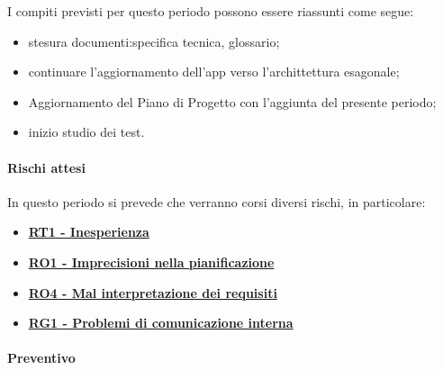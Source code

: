 I compiti previsti per questo periodo possono essere riassunti come segue:  
\begin{itemize}
    \item stesura documenti:specifica tecnica, glossario;
    \item continuare l'aggiornamento dell'app verso l'archittettura esagonale;
    \item Aggiornamento del Piano di Progetto con l’aggiunta del presente periodo;
    \item inizio studio dei test.
    
\end{itemize}

\paragraph{Rischi attesi}  
In questo periodo si prevede che verranno corsi diversi rischi, in particolare:
\begin{itemize}
    \item \textbf{\hyperlink{RT1}{RT1 - Inesperienza}}
    \item \textbf{\hyperlink{RO1}{RO1 - Imprecisioni nella pianificazione}}
    \item \textbf{\hyperlink{RO4}{RO4 - Mal interpretazione dei requisiti}}
    \item \textbf{\hyperlink{RG1}{RG1 - Problemi di comunicazione interna}}
\end{itemize}

\paragraph{Preventivo} \hspace{1cm} 
\\ \hspace{1cm} \\

